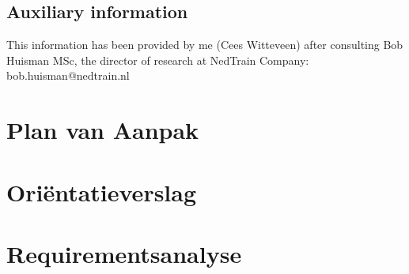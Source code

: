 \begin{appendices}
\subsection*{Auxiliary information}

This information has been provided by me (Cees Witteveen) after consulting Bob Huisman MSc, the director of research at NedTrain Company: bob.huisman@nedtrain.nl
\newpage

\cfoot[\fancyplain{}{\thepage}]{\fancyplain{}{\thepage}}

\section{Plan van Aanpak} \label{app:B}
\newpage


\section{Ori\"entatieverslag} \label{app:C}
\newpage


\section{Requirementsanalyse} \label{app:D}
\newpage


\end{appendices}
